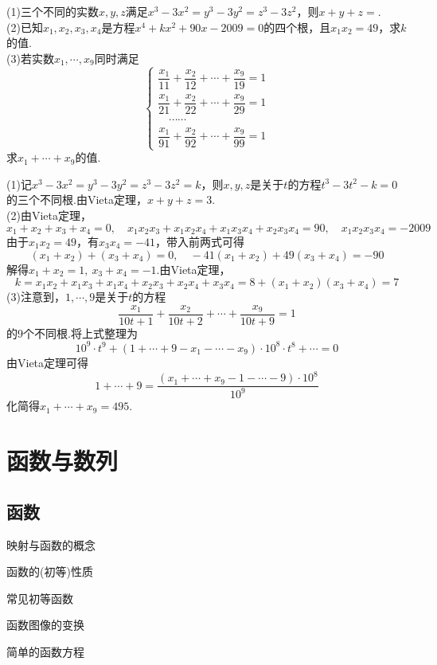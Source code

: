 \documentclass[lang=cn, zihao=5]{elegantbook}
\newcommand{\tk}{\uline{\hspace{4em}}}
\begin{document}
\begin{example}
	(1)三个不同的实数$x,y,z$满足$x^3-3x^2=y^3-3y^2=z^3-3z^2$，则$x+y+z=$\tk . \\
	(2)已知$x_1,x_2,x_3,x_4$是方程$x^4+kx^2+90x-2009=0$的四个根，且$x_1x_2=49$，求$k$的值. \\
	(3)若实数$x_1, \cdots ,x_9$同时满足$$\begin{cases}
		\dfrac{x_1}{11} + \dfrac{x_2}{12} + \cdots + \dfrac{x_9}{19} = 1 \\
		\dfrac{x_1}{21} + \dfrac{x_2}{22} + \cdots + \dfrac{x_9}{29} = 1 \\ 
		\quad \cdots \cdots \\
		\dfrac{x_1}{91} + \dfrac{x_2}{92} + \cdots + \dfrac{x_9}{99} = 1
	\end{cases}$$
	求$x_1+ \cdots + x_9$的值.
\end{example}
\begin{solution}
	(1)记$x^3-3x^2=y^3-3y^2=z^3-3z^2=k$，则$x,y,z$是关于$t$的方程$t^3-3t^2-k=0$的三个不同根.由Vieta定理，$x+y+z=3$. \\
	(2)由Vieta定理，$$x_1+x_2+x_3+x_4=0,\quad x_1x_2x_3+x_1x_2x_4+x_1x_3x_4+x_2x_3x_4=90,\quad x_1x_2x_3x_4=-2009$$
	由于$x_1x_2=49$，有$x_3x_4=-41$，带入前两式可得$$(x_1+x_2)+(x_3+x_4)=0,\quad -41(x_1+x_2)+49(x_3+x_4)=-90$$
	解得$x_1+x_2=1,~x_3+x_4=-1$.由Vieta定理，$$k=x_1x_2+x_1x_3+x_1x_4+x_2x_3+x_2x_4+x_3x_4=8+(x_1+x_2)(x_3+x_4)=7$$
	(3)注意到，$1, \cdots ,9$是关于$t$的方程$$\frac{x_1}{10t+1} + \frac{x_2}{10t+2} + \cdots + \frac{x_9}{10t+9} = 1$$
	的$9$个不同根.将上式整理为$$10^9 \cdot t^{9} + (1 + \cdots + 9 - x_1 - \cdots - x_9) \cdot 10^8 \cdot t^{8} + \cdots = 0$$
	由Vieta定理可得$$1+\cdots +9 = \frac{(x_1 + \cdots + x_9 - 1 - \cdots - 9) \cdot 10^8}{10^9}$$
	化简得$x_1 + \cdots + x_9 = 495$.
\end{solution}

\part{函数与数列}

\chapter{函数}

\begin{introduction}
	\item 映射与函数的概念
	\item 函数的(初等)性质
	\item 常见初等函数
	\item 函数图像的变换
	\item 简单的函数方程
\end{introduction}
\end{document}

